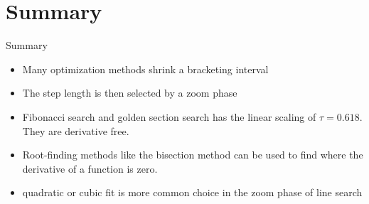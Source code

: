 \documentclass{beamer}
\begin{document}
\section{Summary}
\begin{frame}{Summary}
    \begin{itemize}
        \item Many optimization methods shrink a bracketing interval
        \item The step length is then selected by a zoom phase
        \item Fibonacci search and golden section search has the linear scaling of $\tau = 0.618$. They are derivative free.
        \item Root-finding methods like the bisection method can be used to find where the derivative of a function is zero.
        \item quadratic or cubic fit is more common choice in the zoom phase of line search
    \end{itemize}
\end{frame}
\end{document}
